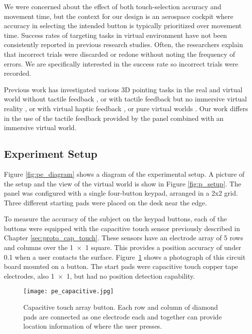 We were concerned about the effect of both touch-selection accuracy and movement time, but the context for our design is an aerospace cockpit where accuracy in selecting the intended button is typically prioritized over movement time.
Success rates of targeting tasks in virtual environment have not been consistently reported in previous research studies.
Often, the researchers explain that incorrect trials were discarded or redone without noting the frequency of errors.
We are specifically interested in the success rate so incorrect trials were recorded.

Previous work has investigated various 3D pointing tasks in the real and virtual world without tactile feedback \citep{liu_comparing_2009}, or with tactile feedback but no immersive virtual reality \citep{teather_evaluating_2010}, or with virtual haptic feedback \citep{chun_evaluating_2004}, or pure virtual worlds \citep{bruder_touch_2013,grossman_pointing_2004}.
Our work differs in the use of the tactile feedback provided by the panel combined with an immersive virtual world.

\subsection{Experiment Setup}

Figure \ref{fig:pe_diagram} shows a diagram of the experimental setup.
A picture of the setup and the view of the virtual world is show in Figure \ref{fig:p_setup}.
The panel was configured with a single four-button keypad, arranged in a 2x2 grid.
Three different starting pads were placed on the desk near the edge.

To measure the accuracy of the subject on the keypad buttons, each of the buttons were equipped with the capacitive touch sensor previously described in Chapter \ref{sec:proto_cap_touch}.
These sensors have an electrode array of 5 rows and columns over the \SI{1 x 1}{\inch} square.
This provides a position accuracy of under \SI{0.1}{\inch} when a user contacts the surface.
Figure~\ref{fig:pe_capacitive} shows a photograph of this circuit board mounted on a button.
The start pads were capacitive touch copper tape electrodes, also \SI{1 x 1}{\inch}, but had no position detection capability.

\begin{figure}
    \centering
    \texttt{[image: pe\_capacitive.jpg]}
    \caption{Capacitive touch array button. Each row and column of diamond pads are connected as one electrode each and together can provide location information of where the user presses.}
    \label{fig:pe_capacitive}
\end{figure}

